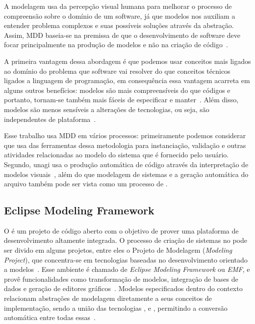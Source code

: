A modelagem usa da percepção visual humana para melhorar o processo de compreensão sobre o domínio de um software, já que modelos nos auxiliam a entender problema complexos e suas possíveis soluções através da abstração. Assim, MDD baseia-se na premissa de que o desenvolvimento de software deve focar principalmente na produção de modelos e não na criação de código~\cite{selic2003pragmatics}.

A primeira vantagem dessa abordagem é que podemos usar conceitos mais ligados ao domínio do problema que software vai resolver do que conceitos técnicos ligados a linguagem de programação, em consequência essa vantagem acarreta em alguns outros benefícios: modelos são mais compreensíveis do que códigos e portanto, tornam-se também mais fáceis de especificar e manter~\cite{selic2003pragmatics}. Além disso, modelos são menos sensíveis a alterações de tecnologias, ou seja, são independentes de plataforma~\cite{selic2003pragmatics}. 

Esse trabalho usa MDD em vários processos: primeiramente podemos considerar que \zanshin usa das ferramentas dessa metodologia para instanciação, validação e outras atividades relacionadas ao modelo do sistema que é fornecido pelo usuário. Segundo, unagi usa o produção automática de código através da interpretação de modelos visuais~\cite{selic2003pragmatics, viyovic2014sirius}, além do que  modelagem de sistemas e a geração automática do arquivo \xml também pode ser vista como um processo de \mdd.


\subsection{Eclipse Modeling Framework}
O \eclipse é um projeto de código aberto com o objetivo de prover uma plataforma de desenvolvimento altamente integrada. O processo de criação de sistemas no \eclipse pode ser divido em alguns projetos, entre eles o Projeto de Modelagem (\textit{Modeling Project}), que concentra-se em tecnologias baseadas no desenvolvimento orientado a modelos~\cite{steinberg2008emf}. Esse ambiente é chamado de \textit{Eclipse Modeling Framework} ou \textit{EMF}, e provê funcionalidades como transformação de modelos, integração de bases de dados e geração de editores gráficos~\cite{steinberg2008emf}. Modelos especificados dentro do contexto \emf relacionam abstrações de modelagem diretamente a seus conceitos de implementação, sendo a união das tecnologias \uml, \xml e \java, permitindo a conversão automática entre todas essas~\cite{steinberg2008emf}. 

